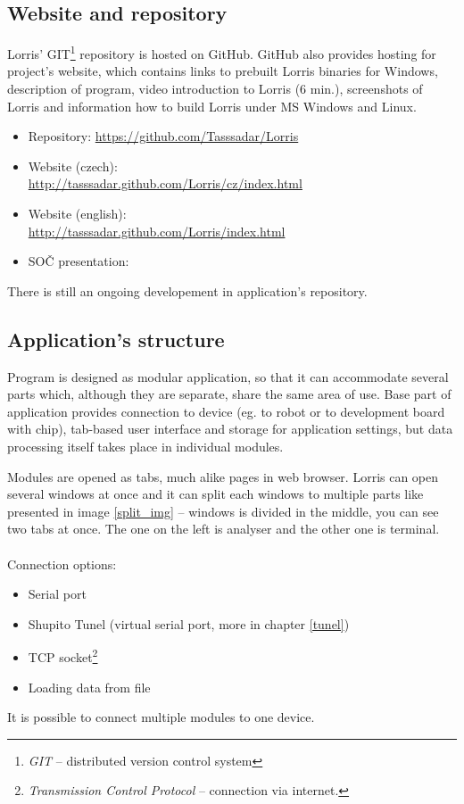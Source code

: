 \documentclass[12pt, a4paper, oneside]{article}
\newcommand{\It}{\textit}  %
\begin{document}
\subsection{Website and repository}
Lorris' GIT\footnote{\It{GIT} -- distributed version control system} repository is hosted on GitHub\cite{github}. GitHub also provides hosting for project's website, which contains links to prebuilt Lorris binaries for Windows, description of program, video introduction to Lorris (6 min.), screenshots of Lorris and information how to build Lorris under MS Windows and Linux.
\begin{itemize}
    \item Repository: \url{https://github.com/Tasssadar/Lorris}
    \item Website (czech):\\ \url{http://tasssadar.github.com/Lorris/cz/index.html}
    \item Website (english):\\ \url{http://tasssadar.github.com/Lorris/index.html}
    \item SOČ presentation: \\ 
\end{itemize}
There is still an ongoing developement in application's repository.
\subsection{Application's structure}
Program is designed as modular application, so that it can accommodate several parts which, although they are separate, share the same area of use.
Base part of application provides connection to device (eg. to robot or to development board with chip), tab-based user interface and storage for application settings, but data processing itself takes place in individual modules.

Modules are opened as tabs, much alike pages in web browser. Lorris can open several windows at once and it can split each windows to multiple parts like presented in image \ref{split_img} -- windows is divided in the middle, you can see two tabs at once. The one on the left is analyser and the other one is terminal. \\
\\
\noindent Connection options:
\begin{itemize}
    \item Serial port
    \item Shupito Tunel (virtual serial port, more in chapter \ref{tunel})
    \item TCP socket\footnote{\It{Transmission Control Protocol} -- connection via internet.}
    \item Loading data from file
\end{itemize}
It is possible to connect multiple modules to one device.
\end{document}
